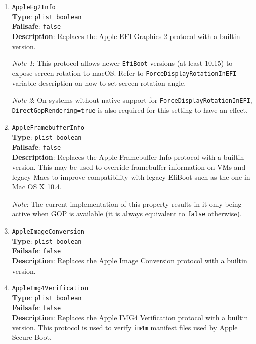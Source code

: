\documentclass[]{article}
\begin{document}
\begin{enumerate}
\item
  \texttt{AppleEg2Info}\\
  \textbf{Type}: \texttt{plist\ boolean}\\
  \textbf{Failsafe}: \texttt{false}\\
  \textbf{Description}: Replaces the Apple EFI Graphics 2 protocol with a builtin
  version.

  \emph{Note 1}: This protocol allows newer \texttt{EfiBoot} versions (at least 10.15)
  to expose screen rotation to macOS. Refer to \texttt{ForceDisplayRotationInEFI}
  variable description on how to set screen rotation angle.

  \emph{Note 2}: On systems without native
  support for \texttt{ForceDisplayRotationInEFI}, \texttt{DirectGopRendering=true}
  is also required for this setting to have an effect.

\item
  \texttt{AppleFramebufferInfo}\\
  \textbf{Type}: \texttt{plist\ boolean}\\
  \textbf{Failsafe}: \texttt{false}\\
  \textbf{Description}: Replaces the Apple Framebuffer Info protocol with a builtin
  version. This may be used to override framebuffer information on VMs and legacy Macs
  to improve compatibility with legacy EfiBoot such as the one in Mac OS X 10.4.

  \emph{Note}: The current implementation of this property results in it only being
  active when GOP is available (it is always equivalent to \texttt{false} otherwise).

\item
  \texttt{AppleImageConversion}\\
  \textbf{Type}: \texttt{plist\ boolean}\\
  \textbf{Failsafe}: \texttt{false}\\
  \textbf{Description}: Replaces the Apple Image Conversion protocol with a builtin
  version.

\item
  \texttt{AppleImg4Verification}\\
  \textbf{Type}: \texttt{plist\ boolean}\\
  \textbf{Failsafe}: \texttt{false}\\
  \textbf{Description}: Replaces the Apple IMG4 Verification protocol with a builtin
  version. This protocol is used to verify \texttt{im4m} manifest files used by
  Apple Secure Boot.


\end{enumerate}
\end{document}
